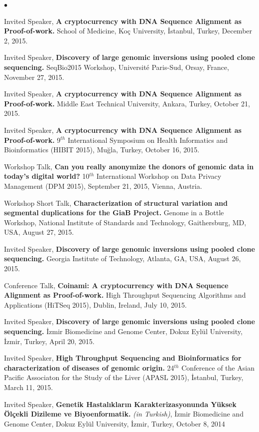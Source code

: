\documentclass[margin,line]{res}
\newenvironment{list2}{
  \begin{list}{$\bullet$}{%
      \setlength{\itemsep}{0in}
      \setlength{\parsep}{0in} \setlength{\parskip}{0in}
      \setlength{\topsep}{0in} \setlength{\partopsep}{0in} 
      \setlength{\leftmargin}{0.2in}}}{\end{list}}
\begin{document}
\begin{resume}
\begin{list2}
\item
  Invited Speaker,
  {\bf A cryptocurrency with DNA Sequence Alignment as Proof-of-work.}
  School of Medicine, Ko\c{c} University, \.{I}stanbul, Turkey, December 2, 2015.
\item
  Invited Speaker, 
  {\bf Discovery of large genomic inversions using pooled clone sequencing.}
  SeqBio2015 Workshop, Université Paris-Sud, Orsay, France, November 27, 2015.
\item
  Invited Speaker,
  {\bf A cryptocurrency with DNA Sequence Alignment as Proof-of-work.}
  Middle East Technical University, Ankara, Turkey, October 21, 2015.
\item
  Invited Speaker,
  {\bf A cryptocurrency with DNA Sequence Alignment as Proof-of-work.}
  9$^{th}$ International Symposium on Health Informatics and Bioinformatics (HIBIT 2015),
   Muğla, Turkey, October 16, 2015.
\item
  Workshop Talk, 
  {\bf Can you really anonymize the donors of genomic data in today's digital world?}
  10$^{th}$ International Workshop on Data Privacy Management (DPM 2015), 
  September 21, 2015, Vienna, Austria.
\item
  Workshop Short Talk, 
  {\bf Characterization of structural variation and segmental duplications for the GiaB Project.}
  Genome in a Bottle Workshop, National Institute of Standards and Technology, Gaithersburg, MD, USA,
  August 27, 2015.
\item
  Invited Speaker, 
  {\bf Discovery of large genomic inversions using pooled clone sequencing.}
  Georgia Institute of Technology, Atlanta, GA, USA, August 26, 2015.
\item
  Conference Talk, 
  {\bf Coinami: A cryptocurrency with DNA Sequence Alignment as Proof-of-work.}
  High Throughput Sequencing Algorithms and Applications (HiTSeq 2015), Dublin, Ireland, July 10, 2015.
\item
  Invited Speaker, 
  {\bf Discovery of large genomic inversions using pooled clone sequencing.}
  İzmir Biomedicine and Genome Center, Dokuz Eylül University, İzmir, Turkey, April 20, 2015.
\item
  Invited Speaker, 
  {\bf High Throughput Sequencing and Bioinformatics for characterization of diseases of genomic origin.}
  24$^{th}$ Conference of the Asian Pacific Associaton for the Study of the Liver (APASL 2015), İstanbul, Turkey, March 11, 2015.
\item
  Invited Speaker, 
  {\bf Genetik Hastalıkların Karakterizasyonunda Yüksek Ölçekli Dizileme ve Biyoenformatik.} {\it (in Turkish)},
  İzmir Biomedicine and Genome Center, Dokuz Eylül University, İzmir, Turkey, October 8, 2014


\end{list2}
\end{resume}
\end{document}

